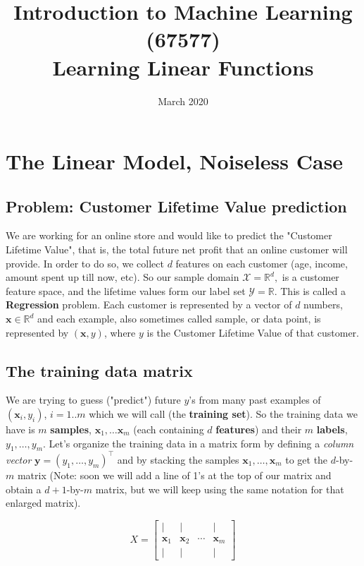 \documentclass[11pt]{article}
\title{{\large{Introduction to Machine Learning (67577)} \\
\vphantom{}Learning Linear Functions}}
\date{March 2020}
\newcommand{\R}{\ensuremath{\mathbb{R}}}
\newcommand{\Tr}{\ensuremath{\top}}
\newcommand{\Xc}{\mathcal{X}}
\newcommand{\Yc}{\mathcal{Y}}
\begin{document}
\maketitle

\tableofcontents
\pagebreak

\section{The Linear Model, Noiseless Case}
\subsection{Problem: Customer Lifetime Value prediction}
We are working for an online store and would like to predict the "Customer Lifetime Value", that is, the total future net profit that an online customer will provide. In order to do so, we collect $d$ features on each customer (age, income, amount spent up till now, etc).
So our sample domain $\Xc=\R^d,$  is a customer feature space, and the lifetime values form our label set $\Yc=\R$. This is called a \textbf{Regression} problem.
Each customer is represented by a vector of $d$ numbers, $\mathbf{x}\in\R^d$ and each example, also sometimes called sample, or data point, is represented by $(\mathbf{x},y)$, where $y$ is the Customer Lifetime Value of that customer.

\subsection{The training data matrix}
We are trying to guess ("predict") future $y$'s from many past examples of $(\mathbf{x}_i,y_i)$, $i=1..m$ which we will call (the \textbf{training set}).
So the training data we have is  $m$ \textbf{samples}, $\mathbf{x}_1,\ldots \mathbf{x}_m$ (each containing $d$ \textbf{features})  and their $m$  \textbf{labels}, $y_1,\ldots,y_m$.
Let's organize the training data in a matrix form by defining a \emph{column vector} $\mathbf{y}=(y_1,\ldots,y_m)^\Tr$ and by stacking the samples $\mathbf{x}_1,\ldots,\mathbf{x}_m$  to get the $d$-by-$m$ matrix (Note: soon we will add a line of 1's at the top of our matrix and obtain a $d+1$-by-$m$ matrix, but we will keep using the same notation for that enlarged matrix).

  \[
 X =
\left[
  \begin{array}{cccc}
    |& | & & | \\
    \mathbf{x}_1 & \mathbf{x}_2 & \cdots & \mathbf{x}_m \\
 |& | & & |
  \end{array}
\right]
\]
\end{document}
